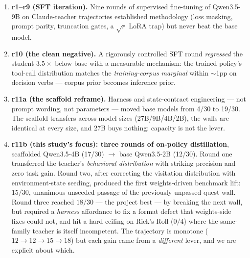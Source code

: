 \documentclass[11pt]{article}
\begin{document}
\begin{enumerate}
\item \textbf{r1--r9 (SFT iteration).} Nine rounds of supervised fine-tuning of Qwen3.5-9B on
Claude-teacher trajectories established methodology (loss masking, prompt parity,
truncation gates, a $\sqrt{r}$ LoRA trap) but never beat the base model.
\item \textbf{r10 (the clean negative).} A rigorously controlled SFT round \emph{regressed} the
student $3.5\times$ below base with a measurable mechanism: the trained policy's tool-call
distribution matches the \emph{training-corpus marginal} within $\sim$1pp on decision verbs ---
corpus prior becomes inference prior.
\item \textbf{r11a (the scaffold reframe).} Harness and state-contract engineering --- not prompt
wording, not parameters --- moved base models from 4/30 to 19/30. The scaffold transfers across
model sizes (27B/9B/4B/2B), the walls are identical at every size, and 27B buys nothing:
capacity is not the lever.
\item \textbf{r11b (this study's focus): three rounds of on-policy distillation}, scaffolded
Qwen3.5-4B (17/30) $\rightarrow$ base Qwen3.5-2B (12/30). Round one transferred the teacher's
\emph{behavioral distribution} with striking precision and zero task gain. Round two, after
correcting the visitation distribution with environment-state seeding, produced the first
weights-driven benchmark lift: $15/30$, unanimous unseeded passage of the previously-unpassed
quest wall. Round three reached $18/30$ --- the project best --- by breaking the next wall, but
required a \emph{harness} affordance to fix a format defect that weights-side fixes
could not, and hit a hard ceiling on Rick's Roll ($0/4$) where the same-family teacher is itself
incompetent. The trajectory is monotone ($12 \rightarrow 12 \rightarrow 15 \rightarrow 18$) but
each gain came from a \emph{different} lever, and we are explicit about which.
\end{enumerate}
\end{document}
